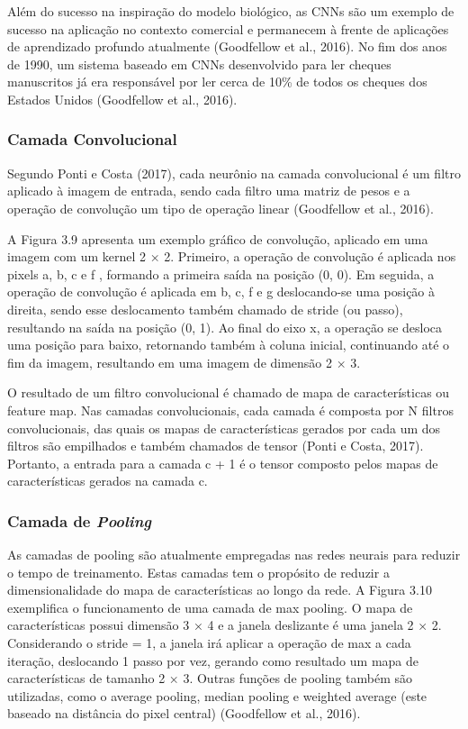 Além do sucesso na inspiração do modelo biológico, as CNNs são um exemplo de sucesso na aplicação no contexto comercial e permanecem à frente de aplicações de aprendizado profundo atualmente (Goodfellow et al., 2016). No fim dos anos de 1990, um sistema baseado em CNNs desenvolvido para ler cheques manuscritos já era responsável por ler cerca de 10\% de todos os cheques dos Estados Unidos (Goodfellow et al., 2016).


\subsubsection{Camada Convolucional}

Segundo Ponti e Costa (2017), cada neurônio na camada convolucional é um filtro aplicado à imagem de entrada, sendo cada filtro uma matriz de pesos e a operação de convolução um tipo de operação linear (Goodfellow et al., 2016).

A Figura 3.9 apresenta um exemplo gráfico de convolução, aplicado em uma imagem com um kernel 2 × 2. Primeiro, a operação de convolução é aplicada nos pixels a, b, c e f , formando a primeira saída na posição (0, 0). Em seguida, a operação de convolução é aplicada em b, c, f e g deslocando-se uma posição à direita, sendo esse deslocamento também chamado de stride (ou passo), resultando na saída na posição (0, 1). Ao final do eixo x, a operação se desloca uma posição para baixo, retornando também à coluna inicial, continuando até o fim da imagem, resultando em uma imagem de dimensão 2 × 3.

O resultado de um filtro convolucional é chamado de mapa de características ou feature map. Nas camadas convolucionais, cada camada é composta por N filtros convolucionais, das quais os mapas de características gerados por cada um dos filtros são empilhados e também chamados de tensor (Ponti e Costa, 2017). Portanto, a entrada para a camada c + 1 é o tensor composto pelos mapas de características gerados na camada c.


\subsubsection{Camada de \textit{Pooling}}

As camadas de pooling são atualmente empregadas nas redes neurais para reduzir o tempo de treinamento. Estas camadas tem o propósito de reduzir a dimensionalidade do mapa de características ao longo da rede. A Figura 3.10 exemplifica o funcionamento de uma camada de max pooling. O mapa de características possui dimensão 3 × 4 e a janela deslizante é uma janela 2 × 2. Considerando o stride = 1, a janela irá aplicar a operação de max a cada iteração, deslocando 1 passo por vez, gerando como resultado um mapa de características de tamanho 2 × 3. Outras funções de pooling também são utilizadas, como o average pooling, median pooling e weighted average (este baseado na distância do pixel central) (Goodfellow et al., 2016).


